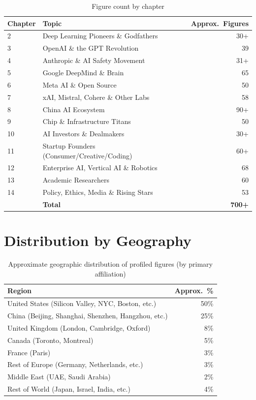 \begin{table}[htbp]
\centering
\caption{Figure count by chapter}
\label{tab:chapter-counts}
\begin{tabularx}{0.85\textwidth}{lXr}
\hline
\textbf{Chapter} & \textbf{Topic} & \textbf{Approx.\ Figures} \\
\hline
\rowcolor{figLightGray}
2 & Deep Learning Pioneers \& Godfathers & 30+ \\
3 & OpenAI \& the GPT Revolution & 39 \\
\rowcolor{figLightGray}
4 & Anthropic \& AI Safety Movement & 31+ \\
5 & Google DeepMind \& Brain & 65 \\
\rowcolor{figLightGray}
6 & Meta AI \& Open Source & 50 \\
7 & xAI, Mistral, Cohere \& Other Labs & 58 \\
\rowcolor{figLightGray}
8 & China AI Ecosystem & 90+ \\
9 & Chip \& Infrastructure Titans & 50 \\
\rowcolor{figLightGray}
10 & AI Investors \& Dealmakers & 30+ \\
11 & Startup Founders (Consumer/Creative/Coding) & 60+ \\
\rowcolor{figLightGray}
12 & Enterprise AI, Vertical AI \& Robotics & 68 \\
13 & Academic Researchers & 60 \\
\rowcolor{figLightGray}
14 & Policy, Ethics, Media \& Rising Stars & 53 \\
\hline
& \textbf{Total} & \textbf{700+} \\
\hline
\end{tabularx}
\end{table}


\section{Distribution by Geography}
\label{sec:appendix-geo}

\begin{table}[htbp]
\centering
\caption{Approximate geographic distribution of profiled figures (by primary affiliation)}
\label{tab:geo-distribution}
\begin{tabularx}{0.7\textwidth}{Xr}
\hline
\textbf{Region} & \textbf{Approx.\ \%} \\
\hline
\rowcolor{figLightGray}
United States (Silicon Valley, NYC, Boston, etc.) & 50\% \\
China (Beijing, Shanghai, Shenzhen, Hangzhou, etc.) & 25\% \\
\rowcolor{figLightGray}
United Kingdom (London, Cambridge, Oxford) & 8\% \\
Canada (Toronto, Montreal) & 5\% \\
\rowcolor{figLightGray}
France (Paris) & 3\% \\
Rest of Europe (Germany, Netherlands, etc.) & 3\% \\
\rowcolor{figLightGray}
Middle East (UAE, Saudi Arabia) & 2\% \\
Rest of World (Japan, Israel, India, etc.) & 4\% \\
\hline
\end{tabularx}
\end{table}


